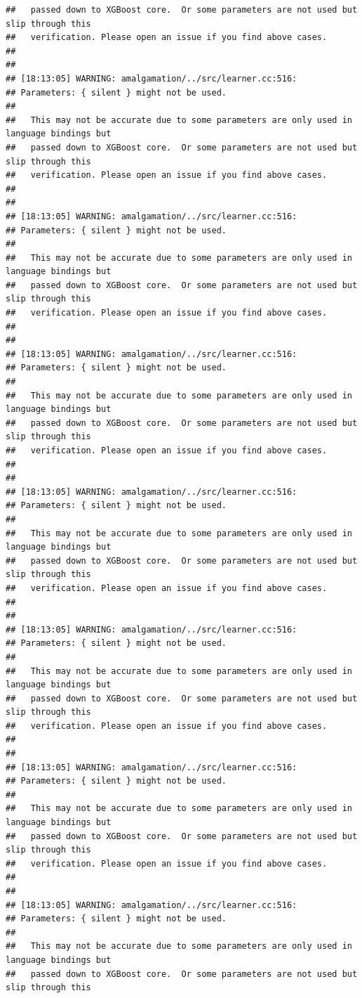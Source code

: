 \documentclass[AMS,STIX2COL]{WileyNJD-v2}\usepackage[]{graphicx}\usepackage[]{color}
\makeatletter
\newenvironment{kframe}{%
 \def\at@end@of@kframe{}%
 \ifinner\ifhmode%
  \def\at@end@of@kframe{\end{minipage}}%
  \begin{minipage}{\columnwidth}%
 \fi\fi%
 \def\FrameCommand##1{\hskip\@totalleftmargin \hskip-\fboxsep
 \colorbox{shadecolor}{##1}\hskip-\fboxsep
     \hskip-\linewidth \hskip-\@totalleftmargin \hskip\columnwidth}%
 \MakeFramed {\advance\hsize-\width
   \@totalleftmargin\z@ \linewidth\hsize
   \@setminipage}}%
 {\par\unskip\endMakeFramed%
 \at@end@of@kframe}
\newenvironment{knitrout}{}{} %
\makeatother
\begin{document}
\begin{knitrout}
\begin{kframe}
\begin{verbatim}
##   passed down to XGBoost core.  Or some parameters are not used but slip through this
##   verification. Please open an issue if you find above cases.
## 
## 
## [18:13:05] WARNING: amalgamation/../src/learner.cc:516: 
## Parameters: { silent } might not be used.
## 
##   This may not be accurate due to some parameters are only used in language bindings but
##   passed down to XGBoost core.  Or some parameters are not used but slip through this
##   verification. Please open an issue if you find above cases.
## 
## 
## [18:13:05] WARNING: amalgamation/../src/learner.cc:516: 
## Parameters: { silent } might not be used.
## 
##   This may not be accurate due to some parameters are only used in language bindings but
##   passed down to XGBoost core.  Or some parameters are not used but slip through this
##   verification. Please open an issue if you find above cases.
## 
## 
## [18:13:05] WARNING: amalgamation/../src/learner.cc:516: 
## Parameters: { silent } might not be used.
## 
##   This may not be accurate due to some parameters are only used in language bindings but
##   passed down to XGBoost core.  Or some parameters are not used but slip through this
##   verification. Please open an issue if you find above cases.
## 
## 
## [18:13:05] WARNING: amalgamation/../src/learner.cc:516: 
## Parameters: { silent } might not be used.
## 
##   This may not be accurate due to some parameters are only used in language bindings but
##   passed down to XGBoost core.  Or some parameters are not used but slip through this
##   verification. Please open an issue if you find above cases.
## 
## 
## [18:13:05] WARNING: amalgamation/../src/learner.cc:516: 
## Parameters: { silent } might not be used.
## 
##   This may not be accurate due to some parameters are only used in language bindings but
##   passed down to XGBoost core.  Or some parameters are not used but slip through this
##   verification. Please open an issue if you find above cases.
## 
## 
## [18:13:05] WARNING: amalgamation/../src/learner.cc:516: 
## Parameters: { silent } might not be used.
## 
##   This may not be accurate due to some parameters are only used in language bindings but
##   passed down to XGBoost core.  Or some parameters are not used but slip through this
##   verification. Please open an issue if you find above cases.
## 
## 
## [18:13:05] WARNING: amalgamation/../src/learner.cc:516: 
## Parameters: { silent } might not be used.
## 
##   This may not be accurate due to some parameters are only used in language bindings but
##   passed down to XGBoost core.  Or some parameters are not used but slip through this

\end{verbatim}
\end{kframe}
\end{knitrout}
\end{document}
